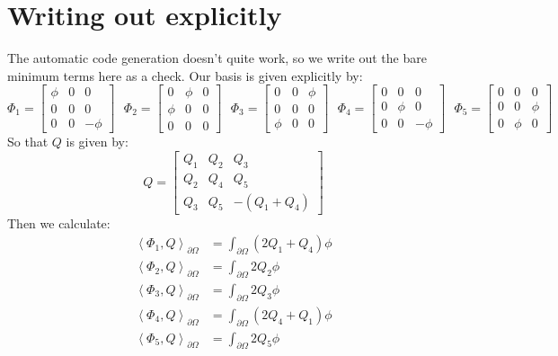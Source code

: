 \documentclass[reqno]{article}
\begin{document}
\section{Writing out explicitly}

The automatic code generation doesn't quite work, so we write out the bare minimum terms here as a check.
Our basis is given explicitly by:
\begin{equation}
    \Phi_1
    =
    \begin{bmatrix}
    \phi &0 &0 \\
    0 &0 &0 \\
    0 &0 &-\phi
    \end{bmatrix}
    \:\:\:
    \Phi_2
    =
    \begin{bmatrix}
    0 &\phi &0 \\
    \phi &0 &0 \\
    0 &0 &0
    \end{bmatrix}
    \:\:\:
    \Phi_3
    =
    \begin{bmatrix}
    0 &0 &\phi \\
    0 &0 &0 \\
    \phi &0 &0
    \end{bmatrix}
    \:\:\:
    \Phi_4
    =
    \begin{bmatrix}
    0 &0 &0 \\
    0 &\phi &0 \\
    0 &0 &-\phi
    \end{bmatrix}
    \:\:\:
    \Phi_5
    =
    \begin{bmatrix}
    0 &0 &0 \\
    0 &0 &\phi \\
    0 &\phi &0
    \end{bmatrix}
    \:\:\:
\end{equation}
So that $Q$ is given by:
\begin{equation}
    Q
    =
    \begin{bmatrix}
    Q_1 &Q_2 &Q_3 \\
    Q_2 &Q_4 &Q_5 \\
    Q_3 &Q_5 &-(Q_1 + Q_4)
    \end{bmatrix}
\end{equation}
Then we calculate:
\begin{equation}
\begin{split}
    \left<\Phi_1, Q\right>_{\partial \Omega}
    &=
    \int_{\partial \Omega} \left( 2Q_1 + Q_4 \right) \phi \\
    \left<\Phi_2, Q\right>_{\partial \Omega}
    &=
    \int_{\partial \Omega} 2 Q_2 \phi \\
    \left<\Phi_3, Q\right>_{\partial \Omega}
    &=
    \int_{\partial \Omega} 2 Q_3 \phi \\
    \left<\Phi_4, Q\right>_{\partial \Omega}
    &=
    \int_{\partial \Omega} \left( 2 Q_4 + Q_1 \right) \phi \\
    \left<\Phi_5, Q\right>_{\partial \Omega}
    &=
    \int_{\partial \Omega} 2 Q_5 \phi
\end{split}
\end{equation}
\end{document}
